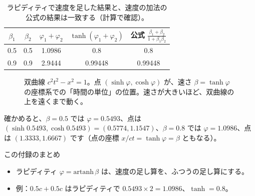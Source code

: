 \documentclass[a4paper,11pt,openany]{ltjsbook}
\begin{document}
\begin{table}[htbp]
\centering
\begin{tabular}{cc|ccc}
\toprule
$\beta_1$ & $\beta_2$ & $\varphi_1+\varphi_2$ & $\tanh(\varphi_1+\varphi_2)$ & 公式 $\tfrac{\beta_1+\beta_2}{1+\beta_1\beta_2}$\\
\midrule
0.5 & 0.5 & 1.0986 & 0.8 & 0.8\\
0.9 & 0.9 & 2.9444 & 0.99448 & 0.99448\\
\bottomrule
\end{tabular}
\caption{ラピディティで速度を足した結果と、速度の加法の公式の結果は一致する（計算で確認）。}
\end{table}

\begin{figure}[htbp]
\centering
{}
\caption{双曲線 $c^2t^2-x^2=1$。点 $(\sinh\varphi,\cosh\varphi)$ が、速さ $\beta=\tanh\varphi$ の座標系での「時間の単位」の位置。速さが大きいほど、双曲線の上を遠くまで動く。}
\end{figure}

確かめると、$\beta=0.5$ では $\varphi=0.5493$、点は $(\sinh0.5493,\cosh0.5493)=(0.5774,1.1547)$、$\beta=0.8$ では $\varphi=1.0986$、点は $(1.3333,1.6667)$ です（点の座標 $x/ct=\tanh\varphi=\beta$ ともなる）。

\begin{pointbox}{この付録のまとめ}
\begin{itemize}[leftmargin=*]
\item ラピディティ $\varphi=\mathrm{artanh}\,\beta$ は、速度の足し算を、ふつうの足し算にする。
\item 例：$0.5c+0.5c$ はラピディティで $0.5493\times2=1.0986$、$\tanh=0.8$。
\end{itemize}
\end{pointbox}
\end{document}
